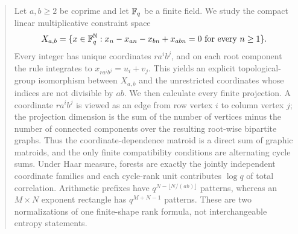 \begin{abstract}
Let $a,b\geq2$ be coprime and let $\F_q$ be a finite field.  We study the
compact linear multiplicative constraint space
\[
 X_{a,b}=\{x\in\F_q^{\N}:x_n-x_{an}-x_{bn}+x_{abn}=0
 \text{ for every }n\geq1\}.
\]
Every integer has unique coordinates $r a^i b^j$, and on each root component
the rule integrates to $x_{r a^i b^j}=u_i+v_j$.  This yields an explicit
topological-group isomorphism between $X_{a,b}$ and the unrestricted
coordinates whose indices are not divisible by $ab$.  We then calculate every
finite projection.  A coordinate $r a^i b^j$ is viewed as an edge from row
vertex $i$ to column vertex $j$; the projection dimension is the sum of
the number of vertices minus the number of connected components over the
resulting root-wise bipartite graphs.  Thus the
coordinate-dependence matroid is a direct sum of graphic matroids, and the
only finite compatibility conditions are alternating cycle sums.  Under Haar
measure, forests are exactly the jointly independent coordinate families and
each cycle-rank unit contributes $\log q$ of total correlation.  Arithmetic
prefixes have $q^{N-\lfloor N/(ab)\rfloor}$ patterns, whereas an $M\times N$
exponent rectangle has $q^{M+N-1}$ patterns.  These are two normalizations of
one finite-shape rank formula, not interchangeable entropy statements.
\end{abstract}
